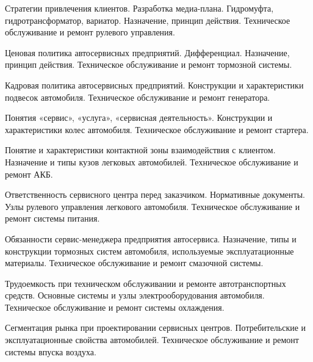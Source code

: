 \documentclass[
	11pt,
	a4paper,
	]
	{article}
\begin{document}
\noindent{} 
	{
		Стратегии привлечения клиентов. Разработка медиа-плана.
	}{
		Гидромуфта, гидротрансформатор, вариатор. Назначение, принцип действия.
	}{
		Техническое обслуживание и ремонт рулевого управления.
	}

\bigskip

\noindent{} 
	{
		Ценовая политика автосервисных предприятий.
	}{
		Дифференциал. Назначение, принцип действия.
	}{
		Техническое обслуживание и ремонт тормозной системы.
	}

\bigskip

\noindent{} 
	{
		Кадровая политика автосервисных предприятий.
	}{
		Конструкции и характеристики подвесок автомобиля.
	}{
		Техническое обслуживание и ремонт генератора.
	}

\bigskip

\noindent{} 
	{
		Понятия «сервис», «услуга», «сервисная деятельность».
	}{
		Конструкции и характеристики колес автомобиля.
	}{
		Техническое обслуживание и ремонт стартера.
	}

\bigskip

\noindent{} 
	{
		Понятие и характеристики контактной зоны взаимодействия с клиентом.
	}{
		Назначение и типы кузов легковых автомобилей.
	}{
		Техническое обслуживание и ремонт АКБ.
	}

\bigskip

\noindent{} 
	{
		Ответственность сервисного центра перед заказчиком. Нормативные документы.
	}{
		Узлы рулевого управления легкового автомобиля.
	}{
		Техническое обслуживание и ремонт системы питания.
	}

\bigskip

\noindent{} 
	{
		Обязанности сервис-менеджера предприятия автосервиса.
	}{
		Назначение, типы и конструкции тормозных систем автомобиля, используемые эксплуатационные материалы.
	}{
		Техническое обслуживание и ремонт смазочной системы.
	}

\bigskip

\noindent{} 
	{
		Трудоемкость при техническом обслуживании и ремонте автотранспортных средств.
	}{
		Основные системы и узлы электрооборудования автомобиля.
	}{
		Техническое обслуживание и ремонт системы охлаждения.
	}

\bigskip

\noindent{} 
	{
		Сегментация рынка при проектировании сервисных центров.
	}{
		Потребительские и эксплуатационные свойства автомобилей.
	}{
		Техническое обслуживание и ремонт системы впуска воздуха.
	}
\end{document}

